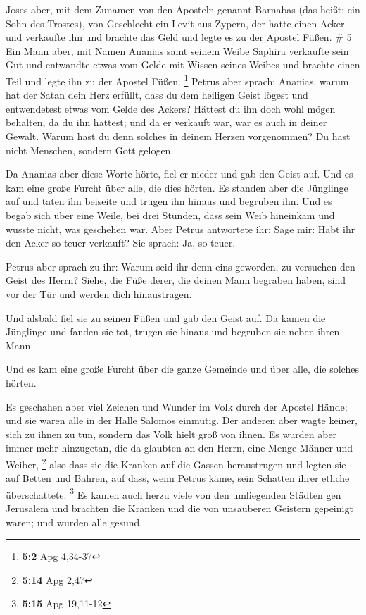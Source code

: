  Joses aber, mit dem Zunamen von den Aposteln genannt
Barnabas (das heißt: ein Sohn des Trostes), von Geschlecht ein Levit aus
Zypern,  der hatte einen Acker und verkaufte ihn und
brachte das Geld und legte es zu der Apostel Füßen. \# 5 
Ein Mann aber, mit Namen Ananias samt seinem Weibe Saphira verkaufte
sein Gut  und entwandte etwas vom Gelde mit Wissen seines
Weibes und brachte einen Teil und legte ihn zu der Apostel Füßen.
\footnote{\textbf{5:2} Apg 4,34-37}  Petrus aber sprach:
Ananias, warum hat der Satan dein Herz erfüllt, dass du dem heiligen
Geist lögest und entwendetest etwas vom Gelde des Ackers? 
Hättest du ihn doch wohl mögen behalten, da du ihn hattest; und da er
verkauft war, war es auch in deiner Gewalt. Warum hast du denn solches
in deinem Herzen vorgenommen? Du hast nicht Menschen, sondern Gott
gelogen.

 Da Ananias aber diese Worte hörte, fiel er nieder und gab
den Geist auf. Und es kam eine große Furcht über alle, die dies hörten.
 Es standen aber die Jünglinge auf und taten ihn beiseite
und trugen ihn hinaus und begruben ihn.  Und es begab sich
über eine Weile, bei drei Stunden, dass sein Weib hineinkam und wusste
nicht, was geschehen war.  Aber Petrus antwortete ihr:
Sage mir: Habt ihr den Acker so teuer verkauft? Sie sprach: Ja, so
teuer.

 Petrus aber sprach zu ihr: Warum seid ihr denn eins
geworden, zu versuchen den Geist des Herrn? Siehe, die Füße derer, die
deinen Mann begraben haben, sind vor der Tür und werden dich
hinaustragen.

 Und alsbald fiel sie zu seinen Füßen und gab den Geist
auf. Da kamen die Jünglinge und fanden sie tot, trugen sie hinaus und
begruben sie neben ihren Mann.

 Und es kam eine große Furcht über die ganze Gemeinde und
über alle, die solches hörten.

 Es geschahen aber viel Zeichen und Wunder im Volk durch
der Apostel Hände; und sie waren alle in der Halle Salomos einmütig.
 Der anderen aber wagte keiner, sich zu ihnen zu tun,
sondern das Volk hielt groß von ihnen.  Es wurden aber
immer mehr hinzugetan, die da glaubten an den Herrn, eine Menge Männer
und Weiber, \footnote{\textbf{5:14} Apg 2,47}  also dass
sie die Kranken auf die Gassen heraustrugen und legten sie auf Betten
und Bahren, auf dass, wenn Petrus käme, sein Schatten ihrer etliche
überschattete. \footnote{\textbf{5:15} Apg 19,11-12}  Es
kamen auch herzu viele von den umliegenden Städten gen Jerusalem und
brachten die Kranken und die von unsauberen Geistern gepeinigt waren;
und wurden alle gesund.

